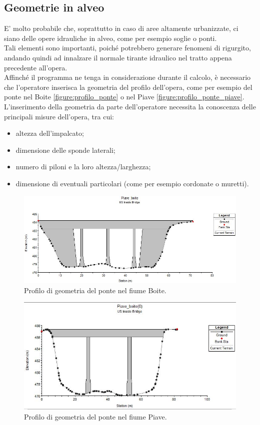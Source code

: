\subsection{Geometrie in alveo}
E' molto probabile che, soprattutto in caso di aree altamente urbanizzate, ci siano delle opere idrauliche in alveo, come per esempio soglie o ponti.\\
Tali elementi sono importanti, poiché potrebbero generare fenomeni di rigurgito, andando quindi ad innalzare il normale tirante idraulico nel tratto appena precedente all'opera.\\
Affinché il programma ne tenga in considerazione durante il calcolo, è necessario che l'operatore inserisca la geometria del profilo dell'opera, come per esempio del ponte nel Boite \eqref{figure:profilo_ponte} o nel Piave \eqref{figure:profilo_ponte_piave}.\\
L'inserimento della geometria da parte dell'operatore necessita la conoscenza delle principali misure dell'opera, tra cui:
\begin{itemize}
    \item altezza dell'impalcato;
    \item dimensione delle sponde laterali;
    \item numero di piloni e la loro altezza/larghezza;
    \item dimensione di eventuali particolari (come per esempio cordonate o muretti).
\end{itemize} 
\begin{figure}[htb] \centering
    \includegraphics[scale=0.6]{immagini/profilo_ponte.JPG}
    \caption{Profilo di geometria del ponte nel fiume Boite.}
    \label{figure:profilo_ponte}
\end{figure}
\begin{figure}[htb] \centering
    \includegraphics[scale=0.6]{immagini/profilo_ponte_piave.JPG}
    \caption{Profilo di geometria del ponte nel fiume Piave.}
    \label{figure:profilo_ponte_piave}
\end{figure}

